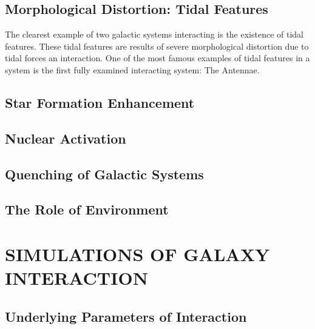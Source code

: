 \subsection{Morphological Distortion: Tidal Features}
\noindent The clearest example of two galactic systems interacting is the existence of tidal features. These tidal features are results of severe morphological distortion due to tidal forces an interaction. One of the most famous examples of tidal features in a system is the first fully examined interacting system: The Antennae.




\subsection{Star Formation Enhancement} 
\subsection{Nuclear Activation}
\subsection{Quenching of Galactic Systems}
\subsection{The Role of Environment}

\section{SIMULATIONS OF GALAXY INTERACTION}

\subsection{Underlying Parameters of Interaction}

